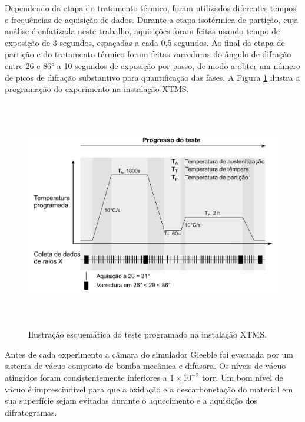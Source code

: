 Dependendo da etapa do tratamento térmico, foram utilizados diferentes tempos e frequências de aquisição de dados. Durante a etapa isotérmica de partição, cuja análise é enfatizada neste trabalho, aquisições foram feitas usando tempo de exposição de 3 segundos, espaçadas a cada 0,5 segundos. Ao final da etapa de partição e do tratamento térmico foram feitas varreduras do ângulo de difração entre 26 e 86° a 10 segundos de exposição por passo, de modo a obter um número de picos de difração substantivo para quantificação das fases. A Figura \ref{fig:esqXTMS} ilustra a programação do experimento na instalação XTMS.

\begin{figure}
  \includegraphics[height=10cm]{img/expproc_XTMS.pdf}
  \caption{Ilustração esquemática do teste programado na instalação XTMS.}
  \label{fig:esqXTMS}
\end{figure}

Antes de cada experimento a câmara do simulador Gleeble foi evacuada por um sistema de vácuo composto de bomba mecânica e difusora. Os níveis de vácuo atingidos foram consistentemente inferiores a $1 \times 10^{-2}$ torr. Um bom nível de vácuo é imprescindível para que a oxidação e a descarbonetação do material em sua superfície sejam evitadas durante o aquecimento e a aquisição dos difratogramas.

